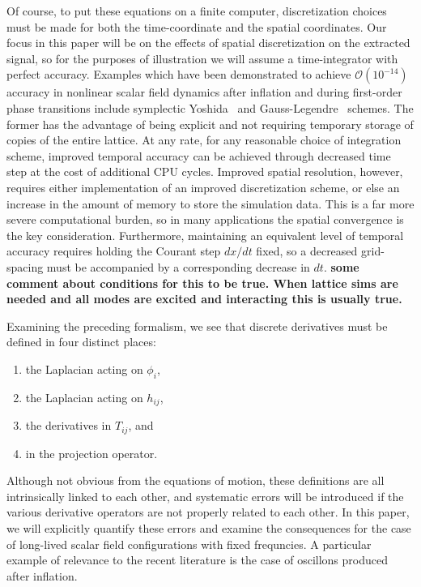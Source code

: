 \documentclass{revtex4}
\begin{document}
Of course, to put these equations on a finite computer, discretization choices must be made for both the time-coordinate and the spatial coordinates.
Our focus in this paper will be on the effects of spatial discretization on the extracted signal, so for the purposes of illustration we will assume a time-integrator with perfect accuracy.
Examples which have been demonstrated to achieve $\mathcal{O}(10^{-14})$ accuracy in nonlinear scalar field dynamics after inflation and during first-order phase transitions include symplectic Yoshida~\cite{} and Gauss-Legendre~\cite{} schemes.
The former has the advantage of being explicit and not requiring temporary storage of copies of the entire lattice.
At any rate, for any reasonable choice of integration scheme, improved temporal accuracy can be achieved through decreased time step at the cost of additional CPU cycles.
Improved spatial resolution, however, requires either implementation of an improved discretization scheme, or else an increase in the amount of memory to store the simulation data.
This is a far more severe computational burden, so in many applications the spatial convergence is the key consideration.
Furthermore, maintaining an equivalent level of temporal accuracy requires holding the Courant step $dx/dt$ fixed, so a decreased grid-spacing must be accompanied by a corresponding decrease in $dt$. {\bf some comment about conditions for this to be true.  When lattice sims are needed and all modes are excited and interacting this is usually true.}

Examining the preceding formalism, we see that discrete derivatives must be defined in four distinct places:
\begin{enumerate}
\item the Laplacian acting on $\phi_i$,
\item the Laplacian acting on $h_{ij}$,
\item the derivatives in $T_{ij}$, and
\item in the projection operator.
\end{enumerate}
Although not obvious from the equations of motion, these definitions are all intrinsically linked to each other, and systematic errors will be introduced if the various derivative operators are not properly related to each other.
In this paper, we will explicitly quantify these errors and examine the consequences for the case of long-lived scalar field configurations with fixed frequncies.
A particular example of relevance to the recent literature is the case of oscillons produced after inflation.
\end{document}
